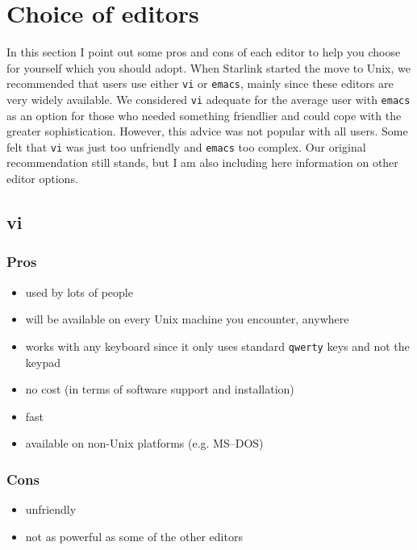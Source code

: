 \documentclass[twoside,11pt,nolof]{starlink}
\begin{document}
\scfrontmatter

\section{Choice of editors}

In this section I point out some pros and cons of each editor to help you
choose for yourself which you should adopt. When Starlink started the move to
Unix, we recommended that users use either \verb|vi| or \verb|emacs|, mainly
since these editors are very widely available.
We considered \verb|vi| adequate
for the average user with \verb|emacs| as an option for those who needed
something friendlier and could cope with the greater
sophistication. However, this advice was not popular with all users. Some felt
that \verb|vi| was just too unfriendly
and \verb|emacs| too complex. Our original recommendation still
stands, but I am also including here information on other editor options.

\subsection{vi}

\subsubsection*{Pros}

\begin{itemize}
\item used by lots of people
\item will be available on every Unix machine you encounter, anywhere
\item works with any keyboard since it only uses standard \texttt{qwerty} keys
and not the keypad
\item no cost (in terms of software support and installation)
\item fast
\item available on non-Unix platforms (e.g. MS--DOS)
\end{itemize}

\subsubsection*{Cons}

\begin{itemize}
\item unfriendly
\item not as powerful as some of the other editors
\end{itemize}
\end{document}
